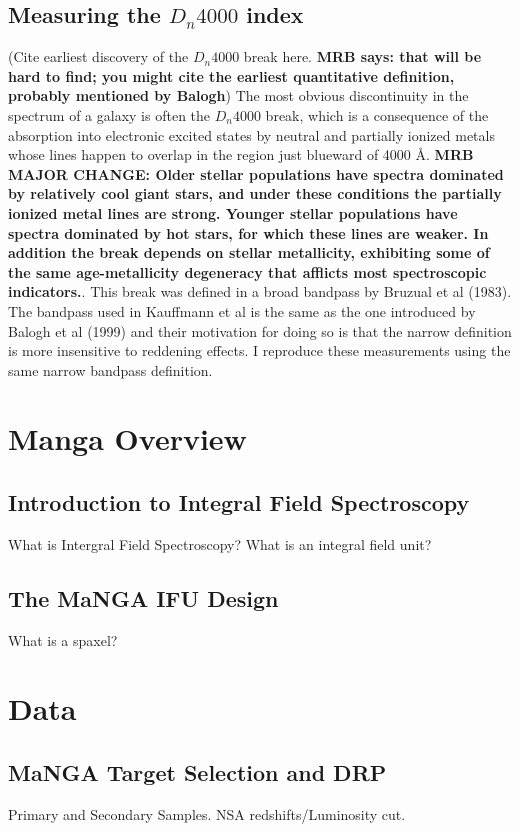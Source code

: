 \subsection{Measuring the $D_{n}4000$ index}
(Cite earliest discovery of the $D_{n}4000$ break here. {\bf MRB says: that will be hard to find; you might cite the earliest quantitative definition, probably mentioned by Balogh})  The most obvious discontinuity in the spectrum of a galaxy is often the $D_{n}4000$ break, which is a consequence of the absorption into electronic excited states by neutral and partially ionized metals whose lines happen to overlap in the region just blueward of 4000 \AA. {\bf MRB MAJOR CHANGE: Older stellar populations have spectra dominated by relatively cool giant stars, and under these conditions the partially ionized metal lines are strong. Younger stellar populations have spectra dominated by hot stars, for which these lines are weaker. In addition the break
depends on stellar metallicity, exhibiting some of the same age-metallicity degeneracy that afflicts most spectroscopic indicators.}. This break was defined in a broad bandpass by Bruzual et al (1983). The bandpass used in Kauffmann et al is the same as the one introduced by Balogh et al (1999) and their motivation for doing so is that the narrow definition is more insensitive to reddening effects. I reproduce these measurements using the same narrow bandpass definition.


\section{Manga Overview}
\subsection{Introduction to Integral Field Spectroscopy}
What is Intergral Field Spectroscopy? What is an integral field unit?

\subsection{The MaNGA IFU Design}
What is a spaxel?

\section{Data}
\subsection{MaNGA Target Selection and DRP}
Primary and Secondary Samples. NSA redshifts/Luminosity cut.


